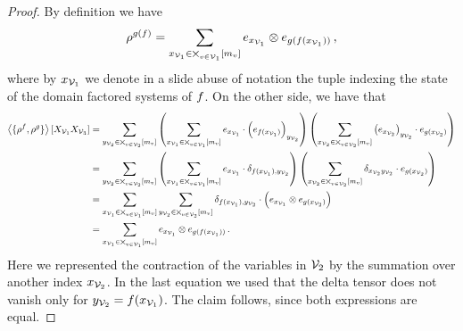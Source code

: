 \begin{proof}
	By definition we have
	\begin{align*}
		\rho^{g(f)} = \sum_{x_{\mathcal{V}_1} \in \bigtimes_{v\in\mathcal{V}_1} [m_{v}]} e_{x_{\mathcal{V}_1}} \otimes e_{g(f(x_{\mathcal{V}_1}))} \, ,
	\end{align*}
	where by $x_{\mathcal{V}_1}$ we denote in a slide abuse of notation the tuple indexing the state of the domain factored systems of $f$.
	On the other side, we have that
	\begin{align*}
	 	\left\langle \{\rho^{f},\rho^{g}\}\right\rangle \left[ X_{\mathcal{V}_1}X_{\mathcal{V}_3} \right]
		& =
		\sum_{y_{\mathcal{V}_2} \in \bigtimes_{v\in\mathcal{V}_2}[m_{v}]}
		\left( \sum_{x_{\mathcal{V}_1} \in \bigtimes_{v\in\mathcal{V}_1}[m_{v}]}  e_{x_{\mathcal{V}_1}} \cdot \left(e_{f(x_{\mathcal{V}_1})}\right)_{y_{\mathcal{V}_2}} \right)
		\left( \sum_{x_{\mathcal{V}_2} \in \bigtimes_{v\in\mathcal{V}_2}[m_{v}]}  \left(e_{x_{\mathcal{V}_2}}\right)_{y_{\mathcal{V}_2}} \cdot e_{g(x_{\mathcal{V}_2})} \right) \\
		& = 
		\sum_{y_{\mathcal{V}_2} \in \bigtimes_{v\in\mathcal{V}_2}[m_{v}]}
		\left( \sum_{x_{\mathcal{V}_1} \in \bigtimes_{v\in\mathcal{V}_1}[m_{v}]}  e_{x_{\mathcal{V}_1}} \cdot \delta_{f(x_{\mathcal{V}_1}),y_{\mathcal{V}_2}} \right)
		\left( \sum_{x_{\mathcal{V}_2} \in \bigtimes_{v\in\mathcal{V}_2}[m_{v}]}  \delta_{x_{\mathcal{V}_2} y_{\mathcal{V}_2}} \cdot e_{g(x_{\mathcal{V}_2})} \right) \\
		& = 
		\sum_{x_{\mathcal{V}_1} \in \bigtimes_{v\in\mathcal{V}_1}[m_{v}]}
		\sum_{y_{\mathcal{V}_2} \in \bigtimes_{v\in\mathcal{V}_2}[m_{v}]}  \delta_{f(x_{\mathcal{V}_1}),y_{\mathcal{V}_2}} \cdot \left(  e_{x_{\mathcal{V}_1}}   \otimes e_{g(x_{\mathcal{V}_2})} \right) \\
		& = 
		\sum_{x_{\mathcal{V}_1} \in \bigtimes_{v\in\mathcal{V}_1} [m_{v}]}
		e_{x_{\mathcal{V}_1}} \otimes e_{g(f(x_{\mathcal{V}_1}))} \, .
	\end{align*}
	Here we represented the contraction of the variables in $\mathcal{V}_2$ by the summation over another index $x_{\mathcal{V}_2}$.
	In the last equation we used that the delta tensor does not vanish only for $y_{\mathcal{V}_2}= f(x_{\mathcal{V}_1})$.
	The claim follows, since both expressions are equal.
\end{proof}

